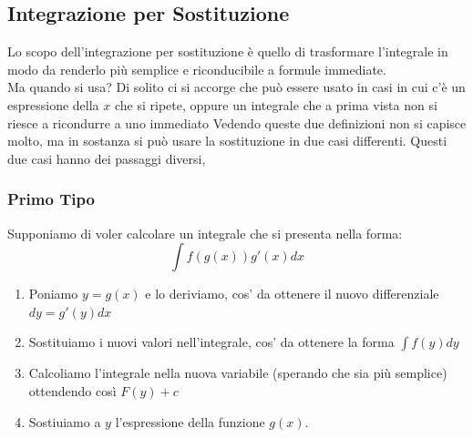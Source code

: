 \documentclass[12pt, a4paper, openany]{book}
\begin{document}
\subsection{Integrazione per Sostituzione}
Lo scopo dell'integrazione per sostituzione è quello di trasformare l'integrale in modo da renderlo più semplice
e riconducibile a formule immediate.
\\ Ma quando si usa? Di solito ci si accorge che può essere usato in casi in cui c'è un espressione della $x$ che si ripete,
oppure un integrale che a prima vista non si riesce a ricondurre a uno immediato
Vedendo queste due definizioni non si capisce molto,
ma in sostanza si può usare la sostituzione in due casi differenti.
Questi due casi hanno dei passaggi diversi,
\subsubsection*{Primo Tipo}
Supponiamo di voler calcolare un integrale che si presenta nella forma:
$$\int f(g(x)) g'(x) dx$$
\begin{enumerate}
	\item Poniamo $y=g(x)$ e lo deriviamo, cos' da ottenere il nuovo differenziale $dy = g'(y)dx$
	\item Sostituiamo i nuovi valori nell'integrale, cos' da ottenere la forma $\int f(y) dy$
	\item Calcoliamo l'integrale nella nuova variabile (sperando che sia più semplice) ottendendo così $F(y) + c$
	\item Sostiuiamo a $y$ l'espressione della funzione $g(x)$.
\end{enumerate}
\end{document}
